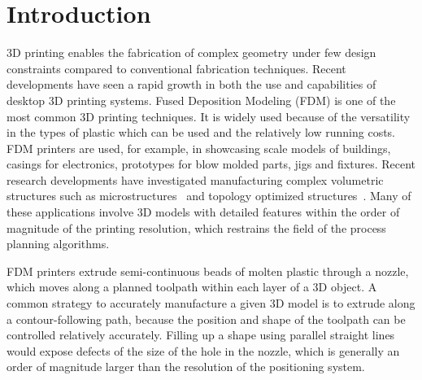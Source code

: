 \section{Introduction}
3D printing enables the fabrication of complex geometry under few design constraints compared to conventional fabrication techniques.
Recent developments have seen a rapid growth in both the use and capabilities of desktop 3D printing systems.
Fused Deposition Modeling (FDM) is one of the most common 3D printing techniques.
It is widely used because of the versatility in the types of plastic which can be used and the relatively low running costs.
FDM printers are used, for example, in showcasing scale models of buildings, casings for electronics, prototypes for blow molded parts, jigs and fixtures.
Recent research developments have investigated manufacturing complex volumetric structures such as microstructures~\cite{bates2018compressive,Al-Ketan2018,Maskery2018} and topology optimized structures~\cite{Zegard2016SMO,Wu2019a,Cheng2019}.
Many of these applications involve 3D models with detailed features within the order of magnitude of the printing resolution, which restrains the field of the process planning algorithms.

FDM printers extrude semi-continuous beads of molten plastic through a nozzle, which moves along a planned toolpath within each layer of a 3D object.
A common strategy to accurately manufacture a given 3D model is to extrude along a contour-following path,
because the position and shape of the toolpath can be controlled relatively accurately.
Filling up a shape using parallel straight lines would expose defects of the size of the hole in the nozzle, which is generally an order of magnitude larger than the resolution of the positioning system.


